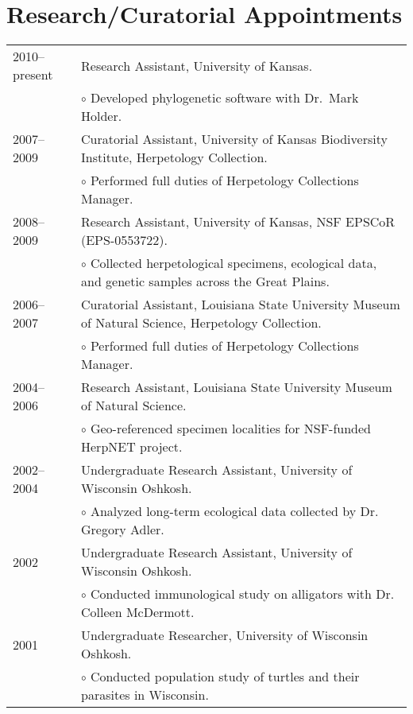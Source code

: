 \documentclass[10pt]{article}
\renewcommand{\labelitemi}{$\circ$}
\newcommand{\tableSubItem}{\addtolength{\leftskip}{1em} \labelitemi \xspace}
\begin{document}
\section*{Research/Curatorial Appointments}
\noindent\begin{tabulary}{\textwidth}{ @{} l L @{} }
2010--present & Research Assistant, University of Kansas. \\
            & \tableSubItem Developed phylogenetic software with Dr.\ Mark
              Holder. \\[0.25em]
2007--2009  & Curatorial Assistant, University of Kansas Biodiversity
              Institute, Herpetology Collection. \\
            & \tableSubItem Performed full duties of Herpetology Collections
              Manager. \\[0.25em]
2008--2009  & Research Assistant, University of Kansas, NSF EPSCoR
              (EPS-0553722). \\
            & \tableSubItem Collected herpetological specimens, ecological
              data, and genetic samples across the Great Plains. \\[0.25em]
2006--2007  & Curatorial Assistant, Louisiana State University Museum of
              Natural Science, Herpetology Collection. \\
            & \tableSubItem Performed full duties of Herpetology Collections
              Manager. \\[0.25em]
2004--2006  & Research Assistant, Louisiana State University Museum of Natural
              Science. \\
            & \tableSubItem Geo-referenced specimen localities for NSF-funded
              HerpNET project. \\[0.25em]
2002--2004  & Undergraduate Research Assistant, University of Wisconsin
              Oshkosh. \\
            & \tableSubItem Analyzed long-term ecological data collected by Dr.
              Gregory Adler. \\[0.25em]
2002        & Undergraduate Research Assistant, University of Wisconsin
              Oshkosh. \\
            & \tableSubItem Conducted immunological study on alligators with
              Dr. Colleen McDermott. \\[0.25em]
2001        & Undergraduate Researcher, University of Wisconsin Oshkosh. \\
            & \tableSubItem Conducted population study of turtles and their
              parasites in Wisconsin. \\
\end{tabulary}
\end{document}
